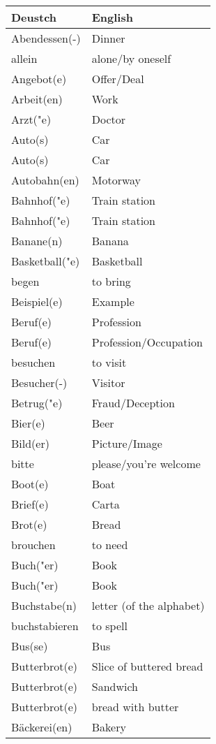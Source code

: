 \documentclass{article}
\renewcommand{\arraystretch}{1}
\begin{document}
\begin{minipage}{0.48\textwidth}
    \centering
    \renewcommand{\arraystretch}{1.5}
    \begin{tabular}{|>{\raggedright\arraybackslash}p{3.5cm}|>{\raggedright\arraybackslash}p{3.5cm}|}
        \hline
        \rowcolor{gray!20} \textbf{Deustch} & \textbf{English} \\
        \hline
        Abendessen(-) & Dinner \\\hline
        allein & alone/by oneself \\\hline
        Angebot(e) & Offer/Deal \\\hline
        Arbeit(en) & Work \\\hline
        Arzt("e) & Doctor \\\hline
        Auto(s) & Car \\\hline
        Auto(s) & Car \\\hline
        Autobahn(en) & Motorway \\\hline
        Bahnhof("e) & Train station \\\hline
        Bahnhof("e) & Train station \\\hline
        Banane(n) & Banana \\\hline
        Basketball("e) & Basketball \\\hline
        begen & to bring \\\hline
        Beispiel(e) & Example \\\hline
        Beruf(e) & Profession \\\hline
        Beruf(e) & Profession/Occupation \\\hline
        besuchen & to visit \\\hline
        Besucher(-) & Visitor \\\hline
        Betrug("e) & Fraud/Deception \\\hline
        Bier(e) & Beer \\\hline
        Bild(er) & Picture/Image \\\hline
        bitte & please/you're welcome \\\hline
        Boot(e) & Boat \\\hline
        Brief(e) & Carta \\\hline
        Brot(e) & Bread \\\hline
        brouchen & to need \\\hline
        Buch("er) & Book \\\hline
        Buch("er) & Book \\\hline
        Buchstabe(n) &  letter (of the alphabet) \\\hline
        buchstabieren & to spell \\\hline
        Bus(se) & Bus \\\hline
        Butterbrot(e) & Slice of buttered bread \\\hline
        Butterbrot(e) & Sandwich \\\hline
        Butterbrot(e) & bread with butter \\\hline
        Bäckerei(en) & Bakery \\\hline
    \end{tabular}
\end{minipage}%
\end{document}
